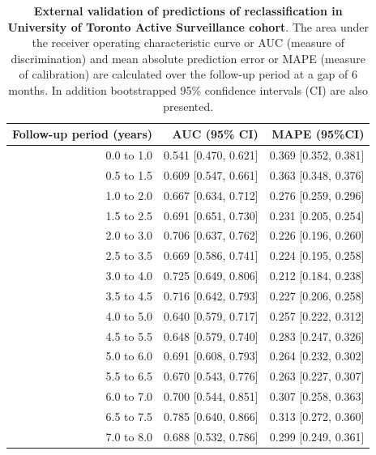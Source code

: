 \begin{table}[!htb]
\small\sf\centering
\caption{\textbf{External validation of predictions of reclassification in University of Toronto Active Surveillance cohort}. The area under the receiver operating characteristic curve or AUC (measure of discrimination) and mean absolute prediction error or MAPE (measure of calibration) are calculated over the follow-up period at a gap of 6 months. In addition bootstrapped 95\% confidence intervals (CI) are also presented.}
\label{tab:AUC_PE_Toronto}
\begin{tabular}{r|r|r}
\hline
\hline
Follow-up period (years) & AUC (95\% CI) & MAPE (95\%CI)\\ 
\hline
0.0 to 1.0 & 0.541 [0.470, 0.621] & 0.369 [0.352, 0.381]\\
0.5 to 1.5 & 0.609 [0.547, 0.661] & 0.363 [0.348, 0.376]\\
1.0 to 2.0 & 0.667 [0.634, 0.712] & 0.276 [0.259, 0.296]\\
1.5 to 2.5 & 0.691 [0.651, 0.730] & 0.231 [0.205, 0.254]\\
2.0 to 3.0 & 0.706 [0.637, 0.762] & 0.226 [0.196, 0.260]\\
2.5 to 3.5 & 0.669 [0.586, 0.741] & 0.224 [0.195, 0.258]\\
3.0 to 4.0 & 0.725 [0.649, 0.806] & 0.212 [0.184, 0.238]\\
3.5 to 4.5 & 0.716 [0.642, 0.793] & 0.227 [0.206, 0.258]\\
4.0 to 5.0 & 0.640 [0.579, 0.717] & 0.257 [0.222, 0.312]\\
4.5 to 5.5 & 0.648 [0.579, 0.740] & 0.283 [0.247, 0.326]\\
5.0 to 6.0 & 0.691 [0.608, 0.793] & 0.264 [0.232, 0.302]\\
5.5 to 6.5 & 0.670 [0.543, 0.776] & 0.263 [0.227, 0.307]\\
6.0 to 7.0 & 0.700 [0.544, 0.851] & 0.307 [0.258, 0.363]\\
6.5 to 7.5 & 0.785 [0.640, 0.866] & 0.313 [0.272, 0.360]\\
7.0 to 8.0 & 0.688 [0.532, 0.786] & 0.299 [0.249, 0.361]\\
\hline
\end{tabular}	
\end{table}

